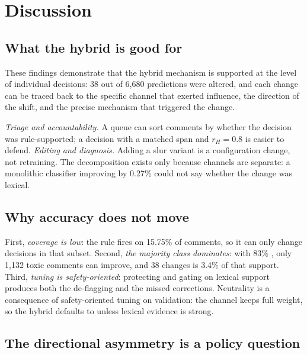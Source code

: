 \section{Discussion}

\label{sec:discussion}

\subsection{What the hybrid is good for}

These findings demonstrate that the hybrid mechanism is supported at the level of individual decisions: 38 out of 6{,}680 predictions were altered, and each change can be traced back to the specific channel that exerted influence, the direction of the shift, and the precise mechanism that triggered the change.

\emph{Triage and accountability.} A queue can sort comments by whether the decision
was rule-supported; a \hate{} decision with a matched span and $r_H=0.8$ is easier to
defend. \emph{Editing and diagnosis.} Adding a slur variant is a configuration change,
not retraining. The decomposition exists only because channels are separate: a
monolithic classifier improving by 0.27\% could not say whether the change was lexical.

\subsection{Why accuracy does not move}

\label{sec:why-neutral}

First, \emph{coverage is low}: the rule fires on 15.75\% of comments, so it can only
change decisions in that subset. Second, \emph{the majority class dominates}: with
83\% \clean{}, only 1{,}132 toxic comments can improve, and 38 changes is 3.4\% of that
support. Third, \emph{tuning is safety-oriented}: protecting \clean{} and gating \hate{}
on lexical support produces both the de-flagging and the missed corrections.
Neutrality is a consequence of safety-oriented tuning on validation: the \clean{} channel keeps full weight, so the hybrid defaults to \clean{} unless lexical evidence is strong.

\subsection{The directional asymmetry is a policy question}

\label{sec:asymmetry}

